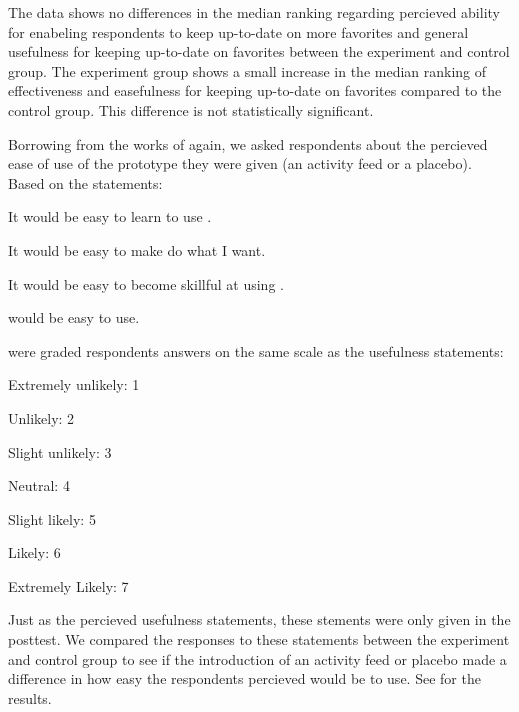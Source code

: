 The data shows no differences in the median ranking regarding \latest{}
percieved ability for enabeling respondents to keep up-to-date on more
favorites and general usefulness for keeping up-to-date on favorites
between the experiment and control group.
The experiment group shows a small increase in the median ranking of
\latest{} effectiveness and easefulness for keeping up-to-date on favorites
compared to the control group. This difference is not statistically
significant.

\parabreak

Borrowing from the works of \citet{davis89} again,
we asked respondents about the percieved ease of use
of the prototype they were given (an activity feed or a placebo).
Based on the statements:
\begin{items}
  \item It would be easy to learn to use \latest{}.
  \item It would be easy to make \latest{} do what I want.
  \item It would be easy to become skillful at using \latest{}.
  \item \latest{} would be easy to use.
\end{items}

were graded respondents answers on the same scale as the usefulness
statements: 

\begin{items}
  \item Extremely unlikely: 1
  \item Unlikely: 2
  \item Slight unlikely: 3
  \item Neutral: 4
  \item Slight likely: 5
  \item Likely: 6
  \item Extremely Likely: 7
\end{items}

Just as the percieved usefulness statements, these stements were only
given in the posttest. We compared the responses to these statements
between the experiment and control group to see if the introduction
of an activity feed or placebo made a difference in how easy
the respondents percieved \latest{} would be to use.
See
 for the results.

